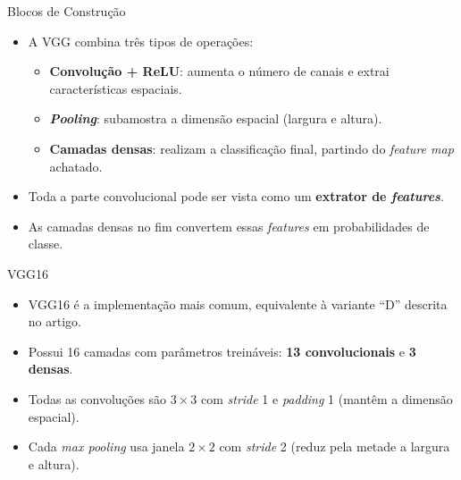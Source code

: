 \documentclass[aspectratio=169,xcolor=dvipsnames]{beamer}
\begin{document}
\begin{frame}{Blocos de Construção}
\begin{itemize}
    \item A VGG combina três tipos de operações:
    \begin{itemize}
        \item \textbf{Convolução + ReLU}: aumenta o número de canais e extrai características espaciais.
        \item \textbf{\textit{Pooling}}: subamostra a dimensão espacial (largura e altura).
        \item \textbf{Camadas densas}: realizam a classificação final, partindo do \textit{feature map} achatado.
    \end{itemize}
    \item Toda a parte convolucional pode ser vista como um \textbf{extrator de \textit{features}}.
    \item As camadas densas no fim convertem essas \textit{features} em probabilidades de classe.
\end{itemize}
\end{frame}

\begin{frame}{VGG16}
\begin{itemize}
    \item VGG16 é a implementação mais comum, equivalente à variante ``D'' descrita no artigo.
    \item Possui 16 camadas com parâmetros treináveis: \textcolor{BrickRed}{\textbf{13 convolucionais}} e \textcolor{PastelBlue2}{\textbf{3 densas}}.
    \item Todas as convoluções são $3\times 3$ com \textit{stride} 1 e \textit{padding} 1 (mantêm a dimensão espacial).
    \item Cada \textit{max pooling} usa janela $2\times 2$ com \textit{stride} 2 (reduz pela metade a largura e altura).
\end{itemize}
\end{frame}
\end{document}
